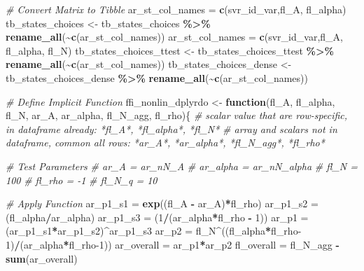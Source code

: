 \documentclass[
]{book}
\newenvironment{Shaded}{\begin{snugshade}}{\end{snugshade}}
\newcommand{\CommentTok}[1]{\textcolor[rgb]{0.56,0.35,0.01}{\textit{#1}}}
\newcommand{\ControlFlowTok}[1]{\textcolor[rgb]{0.13,0.29,0.53}{\textbf{#1}}}
\newcommand{\DecValTok}[1]{\textcolor[rgb]{0.00,0.00,0.81}{#1}}
\newcommand{\KeywordTok}[1]{\textcolor[rgb]{0.13,0.29,0.53}{\textbf{#1}}}
\newcommand{\NormalTok}[1]{#1}
\newcommand{\OperatorTok}[1]{\textcolor[rgb]{0.81,0.36,0.00}{\textbf{#1}}}
\newcommand{\StringTok}[1]{\textcolor[rgb]{0.31,0.60,0.02}{#1}}
\begin{document}
\begin{Shaded}
\begin{Highlighting}[]
\CommentTok{\# Convert Matrix to Tibble}
\NormalTok{ar\_st\_col\_names =}\StringTok{ }\KeywordTok{c}\NormalTok{(svr\_id\_var,}\StringTok{\textquotesingle{}fl\_A\textquotesingle{}}\NormalTok{, }\StringTok{\textquotesingle{}fl\_alpha\textquotesingle{}}\NormalTok{)}
\NormalTok{tb\_states\_choices \textless{}{-}}\StringTok{ }\NormalTok{tb\_states\_choices }\OperatorTok{\%\textgreater{}\%}\StringTok{ }\KeywordTok{rename\_all}\NormalTok{(}\OperatorTok{\textasciitilde{}}\KeywordTok{c}\NormalTok{(ar\_st\_col\_names))}
\NormalTok{ar\_st\_col\_names =}\StringTok{ }\KeywordTok{c}\NormalTok{(svr\_id\_var,}\StringTok{\textquotesingle{}fl\_A\textquotesingle{}}\NormalTok{, }\StringTok{\textquotesingle{}fl\_alpha\textquotesingle{}}\NormalTok{, }\StringTok{\textquotesingle{}fl\_N\textquotesingle{}}\NormalTok{)}
\NormalTok{tb\_states\_choices\_ttest \textless{}{-}}\StringTok{ }\NormalTok{tb\_states\_choices\_ttest }\OperatorTok{\%\textgreater{}\%}\StringTok{ }\KeywordTok{rename\_all}\NormalTok{(}\OperatorTok{\textasciitilde{}}\KeywordTok{c}\NormalTok{(ar\_st\_col\_names))}
\NormalTok{tb\_states\_choices\_dense \textless{}{-}}\StringTok{ }\NormalTok{tb\_states\_choices\_dense }\OperatorTok{\%\textgreater{}\%}\StringTok{ }\KeywordTok{rename\_all}\NormalTok{(}\OperatorTok{\textasciitilde{}}\KeywordTok{c}\NormalTok{(ar\_st\_col\_names))}

\CommentTok{\# Define Implicit Function}
\NormalTok{ffi\_nonlin\_dplyrdo \textless{}{-}}\StringTok{ }\ControlFlowTok{function}\NormalTok{(fl\_A, fl\_alpha, fl\_N, ar\_A, ar\_alpha, fl\_N\_agg, fl\_rho)\{}
  \CommentTok{\# scalar value that are row{-}specific, in dataframe already: *fl\_A*, *fl\_alpha*, *fl\_N*}
  \CommentTok{\# array and scalars not in dataframe, common all rows: *ar\_A*, *ar\_alpha*, *fl\_N\_agg*, *fl\_rho*}

  \CommentTok{\# Test Parameters}
  \CommentTok{\# ar\_A = ar\_nN\_A}
  \CommentTok{\# ar\_alpha = ar\_nN\_alpha}
  \CommentTok{\# fl\_N = 100}
  \CommentTok{\# fl\_rho = {-}1}
  \CommentTok{\# fl\_N\_q = 10}

  \CommentTok{\# Apply Function}
\NormalTok{  ar\_p1\_s1 =}\StringTok{ }\KeywordTok{exp}\NormalTok{((fl\_A }\OperatorTok{{-}}\StringTok{ }\NormalTok{ar\_A)}\OperatorTok{*}\NormalTok{fl\_rho)}
\NormalTok{  ar\_p1\_s2 =}\StringTok{ }\NormalTok{(fl\_alpha}\OperatorTok{/}\NormalTok{ar\_alpha)}
\NormalTok{  ar\_p1\_s3 =}\StringTok{ }\NormalTok{(}\DecValTok{1}\OperatorTok{/}\NormalTok{(ar\_alpha}\OperatorTok{*}\NormalTok{fl\_rho }\OperatorTok{{-}}\StringTok{ }\DecValTok{1}\NormalTok{))}
\NormalTok{  ar\_p1 =}\StringTok{ }\NormalTok{(ar\_p1\_s1}\OperatorTok{*}\NormalTok{ar\_p1\_s2)}\OperatorTok{\^{}}\NormalTok{ar\_p1\_s3}
\NormalTok{  ar\_p2 =}\StringTok{ }\NormalTok{fl\_N}\OperatorTok{\^{}}\NormalTok{((fl\_alpha}\OperatorTok{*}\NormalTok{fl\_rho}\DecValTok{{-}1}\NormalTok{)}\OperatorTok{/}\NormalTok{(ar\_alpha}\OperatorTok{*}\NormalTok{fl\_rho}\DecValTok{{-}1}\NormalTok{))}
\NormalTok{  ar\_overall =}\StringTok{ }\NormalTok{ar\_p1}\OperatorTok{*}\NormalTok{ar\_p2}
\NormalTok{  fl\_overall =}\StringTok{ }\NormalTok{fl\_N\_agg }\OperatorTok{{-}}\StringTok{ }\KeywordTok{sum}\NormalTok{(ar\_overall)}


\end{Highlighting}
\end{Shaded}
\end{document}
